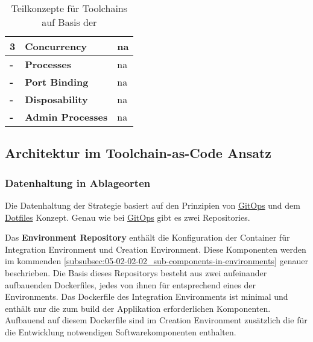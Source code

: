 \begin{table}[H]
\begin{tabular}{ | >{\bfseries}p{} | >{\raggedright\bfseries}p{} | >{}p{} | }
            3
            & %
            Concurrency
            & \acrshort{na} \\
        \hline
            -
            & %
            Processes
            & \acrshort{na} \\
        \hline
            -
            & %
            Port Binding
            & \acrshort{na} \\
        \hline
            -
            & %
            Disposability
            & \acrshort{na} \\
        \hline
            -
            & %
            Admin Processes
            & \acrshort{na} \\
        \hline
    \end{tabular}
    \caption{Teilkonzepte für Toolchains auf Basis der }
    \label{tab:concepts-factors}
\end{table}
\setcounter{factorno}{0}

\subsection{Architektur im Toolchain-as-Code Ansatz}
\label{subsec:05-02-02_architecture-in-the-toolchain-as-code-approach}

\subsubsection{Datenhaltung in Ablageorten}
\label{subsubsec:05-02-02-01_data-storage-in-repositories}

Die Datenhaltung der  Strategie basiert auf den Prinzipien von \hyperref[sec:03-03_gitops-as-further-evolution]{GitOps} und dem \hyperref[sec:03-04_idea-of-dotfiles]{Dotfiles} Konzept. Genau wie bei \hyperref[sec:03-03_gitops-as-further-evolution]{GitOps} gibt es zwei Repositories.

Das \textbf{Environment Repository} enthält die Konfiguration der Container für Integration Environment und Creation Environment. Diese Komponenten werden im kommenden \autoref{subsubsec:05-02-02-02_sub-components-in-environments} genauer beschrieben. Die Basis dieses Repositorys besteht aus zwei aufeinander aufbauenden Dockerfiles, jedes von ihnen für entsprechend eines der Environments. Das Dockerfile des Integration Environments ist minimal und enthält nur die zum \Gls{build} der Applikation erforderlichen Komponenten. Aufbauend auf diesem Dockerfile sind im Creation Environment zusätzlich die für die Entwicklung notwendigen Softwarekomponenten enthalten.

